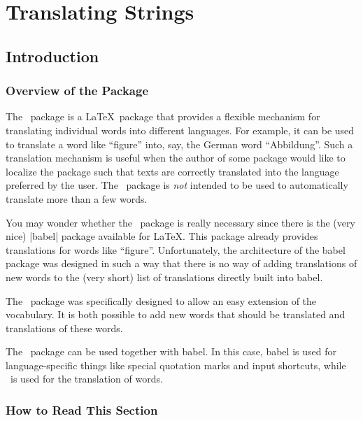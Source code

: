 %
%
%

\section{Translating Strings}

\subsection{Introduction}

\subsubsection{Overview of the Package}

The \translatorname\ package is a \LaTeX\ package that provides a flexible mechanism for translating individual words into different languages. For example, it can be used to translate a word like ``figure'' into, say, the German word ``Abbildung''. Such a translation mechanism is useful when the author of some package would like to localize the package such that texts are correctly translated into the language preferred by the user. The \translatorname\ package is \emph{not} intended to be used to automatically translate more than a few words. 

You may wonder whether the \translatorname\ package is really necessary since there is the (very nice) |babel| package available for \LaTeX. This package already provides translations for words like ``figure''. Unfortunately, the architecture of the babel package was designed in such a way that there is no way of adding translations of new words to the (very short) list of translations directly built into babel.

The \translatorname\ package was specifically designed to allow an easy extension of the vocabulary. It is both possible to add new words that should be translated and translations of these words.

The \translatorname\ package can be used together with babel. In this case, babel is used for language-specific things like special quotation marks and input shortcuts, while \translatorname\ is used for the translation of words.

\subsubsection{How to Read This Section}

